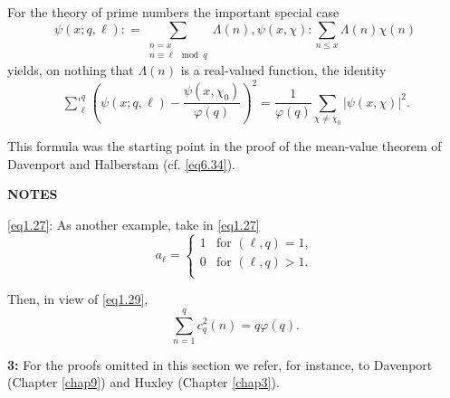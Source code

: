 For the theory of prime numbers the important special case 
\begin{equation*}
\psi (x;q,\ell): = \sum_{\substack{n = x \\ n \equiv \ell \mod q}}
\Lambda (n), \psi (x,\chi):  \sum_{n \leq x} \Lambda (n)\chi (n)
\tag{1.75}\label{eq1.75}  
\end{equation*} 	
yields, on nothing that $\Lambda(n)$ is a real-valued function, the
identity 
\begin{equation*}
\mathop{\sum{}'}_{\ell}^{q} (\psi (x;q,\ell)- \frac{\psi (x,\chi_0)}{\varphi
  (q)})^2 =\frac{1}{\varphi(q)} \sum_{\chi \neq \chi_0} | \psi
(x,\chi)|^2. \tag{1.76}\label{eq1.76} 
\end{equation*}

This formula was the starting  point in the proof of the mean-value
theorem  of Davenport and Halberstam \cite{key2} (cf. \eqref{eq6.34}). 

\medskip

\begin{center}
\textbf{NOTES}
\end{center}

\eqref{eq1.27}: As another example, take in \eqref{eq1.27}
\begin{equation*}
a_\ell =
\begin{cases}
1 & \text{for } (\ell , q)=1,\\
0 & \text{for } (\ell , q)> 1.\\
\end{cases}
\end{equation*}

Then, in view of \eqref{eq1.29},
\begin{equation*}
\sum_{n=1}^{q} c^2_q(n) = q \varphi (q). \tag{1.77}
\end{equation*}


{\bf 3:} For the proofs omitted in this section  we refer, for
instance, to Davenport \cite{key1} (Chapter \ref{chap9}) and Huxley
\cite{key7} (Chapter \ref{chap3}).
